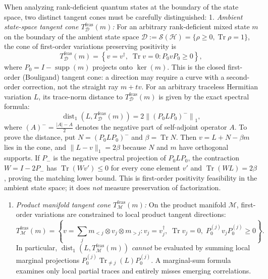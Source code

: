 \documentclass[
  11pt,
]{article}
\providecommand{\tightlist}{%
  \setlength{\itemsep}{0pt}\setlength{\parskip}{0pt}}
\providecommand{\tightlist}{%
  \setlength{\itemsep}{0pt}\setlength{\parskip}{0pt}}
\begin{document}
When analyzing rank-deficient quantum states at the boundary of the state space, two distinct tangent cones must be carefully distinguished:
1. \emph{Ambient state-space tangent cone \(T_{\mathcal D}^{\mathrm{feas}}(m)\):}
For an arbitrary rank-deficient mixed state \(m\) on the boundary of the ambient state space \(\mathcal D := \mathcal S(\mathcal H) = \{\rho \ge 0, \operatorname{Tr}\rho = 1\}\), the cone of first-order variations preserving positivity is
\[
   T_{\mathcal D}^{\mathrm{feas}}(m) = \left\{ v = v^\dagger, \; \operatorname{Tr} v = 0 : P_0 v P_0 \ge 0 \right\},
   \]
where \(P_0=I-\operatorname{supp}(m)\) projects onto \(\ker(m)\).
This is the closed first-order (Bouligand) tangent cone: a direction may
require a curve with a second-order correction, not the straight ray
\(m+tv\).
For an arbitrary traceless Hermitian variation \(L\), its trace-norm distance to \(T_{\mathcal D}^{\mathrm{feas}}(m)\) is given by the exact spectral formula:
\[
   \operatorname{dist}_1(L, T_{\mathcal D}^{\mathrm{feas}}(m)) = 2 \left\lVert (P_0 L P_0)^- \right\rVert_1,
   \]
where \((A)^- = \frac{|A| - A}{2}\) denotes the negative part of self-adjoint operator \(A\).
To prove the distance, put \(N=(P_0LP_0)^-\) and \(\beta=\operatorname{Tr}N\).
Then \(v=L+N-\beta m\) lies in the cone, and
\(\|L-v\|_1=2\beta\) because \(N\) and \(m\) have orthogonal supports.
If \(P_-\) is the negative spectral projection of \(P_0LP_0\), the contraction
\(W=I-2P_-\) has \(\operatorname{Tr}(Wv')\le0\) for every cone element \(v'\)
and \(\operatorname{Tr}(WL)=2\beta\), proving the matching lower bound.
This is first-order positivity feasibility in the ambient state space;
it does \emph{not} measure preservation of factorization.

\begin{enumerate}
\def\labelenumi{\arabic{enumi}.}
\setcounter{enumi}{1}
\tightlist
\item
  \emph{Product manifold tangent cone \(T_{\mathcal M}^{\mathrm{feas}}(m)\):}
  On the product manifold \(\mathcal M\), first-order variations are constrained to local product tangent directions:
  \[
  T_{\mathcal M}^{\mathrm{feas}}(m) = \left\{ v = \sum_j m_{<j}\otimes v_j \otimes m_{>j} : v_j = v_j^\dagger, \; \operatorname{Tr} v_j = 0, \; P_0^{(j)} v_j P_0^{(j)} \ge 0 \right\}.
  \]
  In particular, \(\operatorname{dist}_1(L, T_{\mathcal M}^{\mathrm{feas}}(m))\) \emph{cannot} be evaluated by summing local marginal projections \(P_0^{(j)} \operatorname{Tr}_{\ne j}(L) P_0^{(j)}\). A marginal-sum formula examines only local partial traces and entirely misses emerging correlations.
\end{enumerate}
\end{document}
